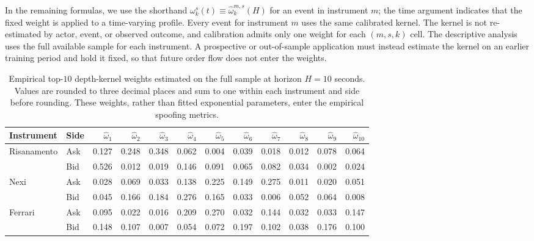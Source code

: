 \documentclass[11pt]{article}
\begin{document}
In the remaining formulas, we use the shorthand
$\omega^{s}_{k}(t)\equiv\widehat\omega^{m,s}_{k}(H)$ for an event in instrument $m$; the time argument indicates that the
fixed weight is applied to a time-varying profile. Every event for instrument $m$ uses the same calibrated kernel. The kernel is not
re-estimated by actor, event, or observed outcome, and calibration admits only one weight for each $(m,s,k)$ cell. The
descriptive analysis uses the full available sample for each instrument. A prospective or out-of-sample application must
instead estimate the kernel on an earlier training period and hold it fixed, so that future order flow does not enter the
weights.

\begin{table}[htbp]
\centering
\caption{Empirical top-$10$ depth-kernel weights estimated on the full sample at horizon $H=10$ seconds. Values are rounded to
three decimal places and sum to one within each instrument and side before rounding. These weights, rather than fitted
exponential parameters, enter the empirical spoofing metrics.}
\label{tab:empirical_depth_kernel_calibration}
\scriptsize
\setlength{\tabcolsep}{1.7pt}
\begin{tabular}{ll*{10}{r}}
\toprule
Instrument & Side & $\widehat\omega_1$ & $\widehat\omega_2$ & $\widehat\omega_3$ & $\widehat\omega_4$ & $\widehat\omega_5$ & $\widehat\omega_6$ & $\widehat\omega_7$ & $\widehat\omega_8$ & $\widehat\omega_9$ & $\widehat\omega_{10}$ \\
\midrule
Risanamento & Ask & 0.127 & 0.248 & 0.348 & 0.062 & 0.004 & 0.039 & 0.018 & 0.012 & 0.078 & 0.064 \\
             & Bid & 0.526 & 0.012 & 0.019 & 0.146 & 0.091 & 0.065 & 0.082 & 0.034 & 0.002 & 0.024 \\
Nexi        & Ask & 0.028 & 0.069 & 0.033 & 0.138 & 0.225 & 0.149 & 0.275 & 0.011 & 0.020 & 0.051 \\
             & Bid & 0.045 & 0.166 & 0.184 & 0.276 & 0.165 & 0.033 & 0.006 & 0.052 & 0.064 & 0.008 \\
Ferrari     & Ask & 0.095 & 0.022 & 0.016 & 0.209 & 0.270 & 0.032 & 0.144 & 0.032 & 0.033 & 0.147 \\
             & Bid & 0.148 & 0.107 & 0.007 & 0.054 & 0.072 & 0.197 & 0.102 & 0.038 & 0.176 & 0.100 \\
\bottomrule
\end{tabular}
\end{table}
\end{document}
